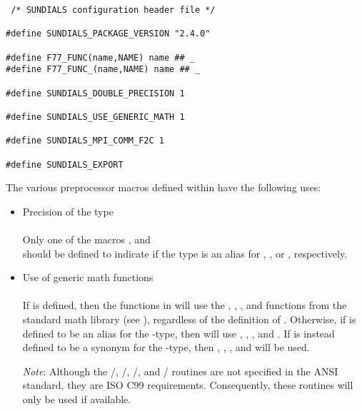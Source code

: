 \begin{lstlisting}
 /* SUNDIALS configuration header file */

#define SUNDIALS_PACKAGE_VERSION "2.4.0"

#define F77_FUNC(name,NAME) name ## _
#define F77_FUNC_(name,NAME) name ## _

#define SUNDIALS_DOUBLE_PRECISION 1

#define SUNDIALS_USE_GENERIC_MATH 1

#define SUNDIALS_MPI_COMM_F2C 1

#define SUNDIALS_EXPORT
\end{lstlisting}


The various preprocessor macros defined within 
have the following uses:
\begin{itemize}

\item Precision of the {\sundials}  type\\ \\
  Only one of the macros ,
   and \\
   should be defined to indicate if the {\sundials}
   type is an alias for , , or ,
  respectively.

\item Use of generic math functions\\ \\
  If  is defined, then the functions
  in  will use the , ,
  , and  functions from the standard math library
  (see ), regardless of the definition of .
  Otherwise, if  is defined to be an alias for the
   {\C}-type, then {\sundials} will use ,
  , , and .  If  is instead
  defined to be a synonym for the  {\C}-type, then
  , , , and  will be used.

  {\em Note}: Although the /, /,
  /, and / routines are not
  specified in the ANSI {\C} standard, they are ISO C99 requirements.
  Consequently, these routines will only be used if available.


\end{itemize}
